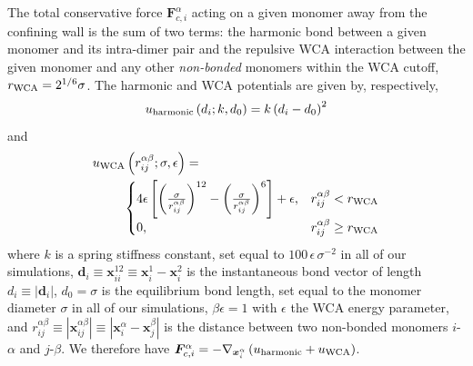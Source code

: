 \documentclass[%
 reprint,
superscriptaddress,
longbibliography,
 amsmath,amssymb,
 prl,
 citeautoscript,
]{revtex4-1}
\begin{document}
The total conservative force ${\boldsymbol F}_{c,i}^{\alpha}$ acting on a given monomer away from the confining wall is the sum of two terms: the harmonic bond between a given monomer and its intra-dimer pair and the repulsive WCA interaction between the given monomer and any other {\it non-bonded} monomers within the WCA cutoff, $r_{\rm WCA} = 2^{1/6} \sigma$. The harmonic and WCA potentials are given by, respectively,
\begin{equation}
u_{\rm harmonic} \left( d_i; k, d_0 \right) = k \left( d_i - d_0 \right)^2
\label{eqn:harmonic}
\end{equation}
and
\begin{equation}
\begin{aligned}
u_{\rm WCA} &\left( r_{ij}^{\alpha \beta}; \sigma, \epsilon \right) = \\
&\!\begin{cases}
4 \epsilon \left[ \left( \frac{\sigma}{r_{ij}^{\alpha \beta}} \right)^{12} - \left( \frac{\sigma}{r_{ij}^{\alpha \beta}} \right)^6 \right] + \epsilon, & r_{ij}^{\alpha \beta} < r_{\rm WCA} \\
0, & r_{ij}^{\alpha \beta} \geq r_{\rm WCA}
\end{cases}
\end{aligned}
\label{eqn:WCA}
\end{equation}
where $k$ is a spring stiffness constant, set equal to $100 \, \epsilon \, \sigma^{-2}$ in all of our simulations, ${\boldsymbol d}_i \equiv {\boldsymbol x}_{ii}^{12} \equiv {\boldsymbol x}_i^1 - {\boldsymbol x}_i^2$ is the instantaneous bond vector of length $d_i \equiv \left| {\boldsymbol d}_i \right|$, $d_0 = \sigma$ is the equilibrium bond length, set equal to the monomer diameter $\sigma$ in all of our simulations, $\beta \epsilon = 1$ with $\epsilon$ the WCA energy parameter, and $r_{ij}^{\alpha \beta} \equiv \left| {\boldsymbol x}_{ij}^{\alpha \beta} \right| \equiv \left| {\boldsymbol x}_i^{\alpha} - {\boldsymbol x}_j^{\beta} \right|$ is the distance between two non-bonded monomers $i$-$\alpha$ and $j$-$\beta$. We therefore have ${\boldsymbol F}_{c,i}^{\alpha} = - \nabla_{{\boldsymbol x}_i^{\alpha}} \left( u_{\rm harmonic} + u_{\rm WCA} \right)$.
\end{document}
